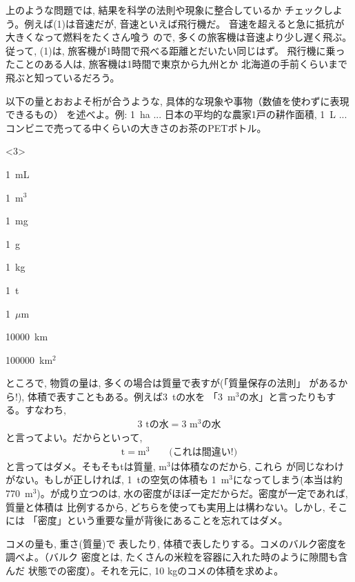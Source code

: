 上のような問題では, 結果を科学の法則や現象に整合しているか
チェックしよう。例えば(1)は音速だが, 音速といえば飛行機だ。
音速を超えると急に抵抗が大きくなって燃料をたくさん喰う
ので, 多くの旅客機は音速より少し遅く飛ぶ。従って, 
(1)は, 旅客機が1時間で飛べる距離とだいたい同じはず。
飛行機に乗ったことのある人は, 旅客機は1時間で東京から九州とか
北海道の手前くらいまで飛ぶと知っているだろう。

\begin{q}\label{q:scale} 以下の量とおおよそ桁が合うような, 
具体的な現象や事物（数値を使わずに表現できるもの）
を述べよ。例: 1~ha ... 日本の平均的な農家1戸の耕作面積, 
1~L ... コンビニで売ってる中くらいの大きさのお茶のPETボトル。
\begin{edaenumerate}<3>
\item 1~mL
\item 1~m$^3$
\item 1~mg
\item 1~g
\item 1~kg
\item 1~t
\item 1~$\mu$m
\item 10000~km
\item 100000~km$^2$
\end{edaenumerate}
\end{q}
\mv

ところで, 物質の量は, 多くの場合は質量で表すが(「質量保存の法則」
があるから!), 体積で表すこともある。例えば3~tの水を
「3~m$^3$の水」と言ったりもする。すなわち, 
\begin{eqnarray}
3 \text{ t}\text{の水}=3 \text{ m}^3\text{の水}\label{eq:water_m3eq_t}
\end{eqnarray}
と言ってよい。だからといって, 
\begin{eqnarray}
\text{t}=\text{m}^3\quad\quad\text{(これは間違い!)}\label{eq:m3eq_t}
\end{eqnarray}
と言ってはダメ。そもそもtは質量, m$^3$は体積なのだから, これら
が同じなわけがない。もしが正しければ, 1~tの空気の体積も
1~m$^3$になってしまう(本当は約770~m$^3$)。が成り立つのは, 
水の密度がほぼ一定だからだ。密度が一定であれば, 質量と体積は
比例するから, どちらを使っても実用上は構わない。しかし, そこには
「密度」という重要な量が背後にあることを忘れてはダメ。


\begin{q}\label{q:rice_weight_vol} コメの量も, 重さ(質量)で
表したり, 体積で表したりする。コメのバルク密度を調べよ。（バルク
密度とは, たくさんの米粒を容器に入れた時のように隙間も含んだ
状態での密度）。それを元に, 10 kgのコメの体積を求めよ。\end{q}
\mv

